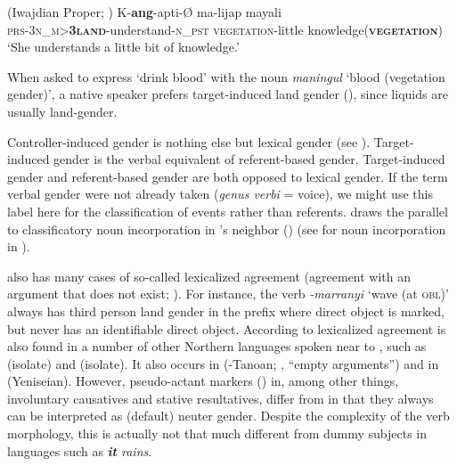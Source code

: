 \documentclass[output=collectionpaper]{langsci/langscibook}
\begin{document}
\ea\label{ex:WDG:73}
 (Iwajdian Proper; \citealt[972]{Singer2012})
\gll K-\textbf{ang}-apti-Ø	ma-lijap	mayali\\
\textsc{prs-3n\_m>\textbf{3land}}-understand-\textsc{n\_pst}	\textsc{vegetation}-little	knowledge(\textbf{\textsc{vegetation}})\\
\glt `She understands a little bit of knowledge.'\\
\z

When asked to express `drink blood' with the noun \textit{maningul} `blood (vegetation gender)', a native speaker prefers target-induced land gender (\citealt[970]{Singer2012}), since liquids are usually land-gender.

Controller-induced gender is nothing else but lexical gender (see ). Target-induced gender is the verbal equivalent of referent-based gender. Target-induced gender and referent-based gender are both opposed to lexical gender. If the term verbal gender were not already taken (\textit{genus verbi} = voice), we might use this label here for the classification of events rather than referents. \cite[978]{Singer2012} draws the parallel to classificatory noun incorporation in 's neighbor  () (see  for noun incorporation in ).

 also has many cases of so-called lexicalized agreement (agreement with an argument that does not exist; \citealt{Singer2011}). For instance, the verb \mbox{\textit{-marranyi}} `wave (at \textsc{obl})' always has third person land gender in the prefix where direct object is marked, but never has an identifiable direct object. According to \citealt[640]{Singer2011} lexicalized agreement is also found in a number of other Northern  languages spoken near to , such as  (isolate) and  (isolate). It also occurs in  (-Tanoan; \citealt[84]{Frantz1995}, ``empty arguments'') and in  (Yeniseian). However,  pseudo-actant markers (\citealt[79]{Vajda2003}) in, among other things, involuntary causatives and stative resultatives, differ from  in that they always can be interpreted as (default) neuter gender. Despite the complexity of the  verb morphology, this is actually not that much different from dummy subjects in  languages such as  \textit{\textbf{it} rains}.
\end{document}
